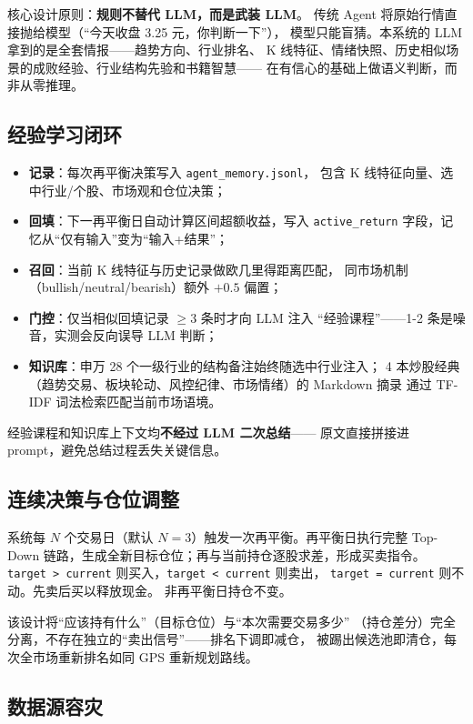 \documentclass[a4paper,11pt]{article}
\begin{document}
核心设计原则：\textbf{规则不替代 LLM，而是武装 LLM}。
传统 Agent 将原始行情直接抛给模型（``今天收盘 3.25 元，你判断一下''），
模型只能盲猜。本系统的 LLM 拿到的是全套情报——趋势方向、行业排名、
K 线特征、情绪快照、历史相似场景的成败经验、行业结构先验和书籍智慧——
在有信心的基础上做语义判断，而非从零推理。

\subsection{经验学习闭环}

\begin{itemize}
    \item \textbf{记录}：每次再平衡决策写入 \texttt{agent\_memory.jsonl}，
    包含 K 线特征向量、选中行业/个股、市场观和仓位决策；
    \item \textbf{回填}：下一再平衡日自动计算区间超额收益，写入
    \texttt{active\_return} 字段，记忆从``仅有输入''变为``输入+结果''；
    \item \textbf{召回}：当前 K 线特征与历史记录做欧几里得距离匹配，
    同市场机制（bullish/neutral/bearish）额外 $+0.5$ 偏置；
    \item \textbf{门控}：仅当相似回填记录 $\geq 3$ 条时才向 LLM 注入
    ``经验课程''——1-2 条是噪音，实测会反向误导 LLM 判断；
    \item \textbf{知识库}：申万 28 个一级行业的结构备注始终随选中行业注入；
    4 本炒股经典（趋势交易、板块轮动、风控纪律、市场情绪）的 Markdown 摘录
    通过 TF-IDF 词法检索匹配当前市场语境。
\end{itemize}

经验课程和知识库上下文均\textbf{不经过 LLM 二次总结}——
原文直接拼接进 prompt，避免总结过程丢失关键信息。

\subsection{连续决策与仓位调整}

系统每 $N$ 个交易日（默认 $N=3$）触发一次再平衡。再平衡日执行完整
Top-Down 链路，生成全新目标仓位；再与当前持仓逐股求差，形成买卖指令。
\texttt{target > current} 则买入，\texttt{target < current} 则卖出，
\texttt{target = current} 则不动。先卖后买以释放现金。
非再平衡日持仓不变。

该设计将``应该持有什么''（目标仓位）与``本次需要交易多少''
（持仓差分）完全分离，不存在独立的``卖出信号''——排名下调即减仓，
被踢出候选池即清仓，每次全市场重新排名如同 GPS 重新规划路线。

\subsection{数据源容灾}
\end{document}
